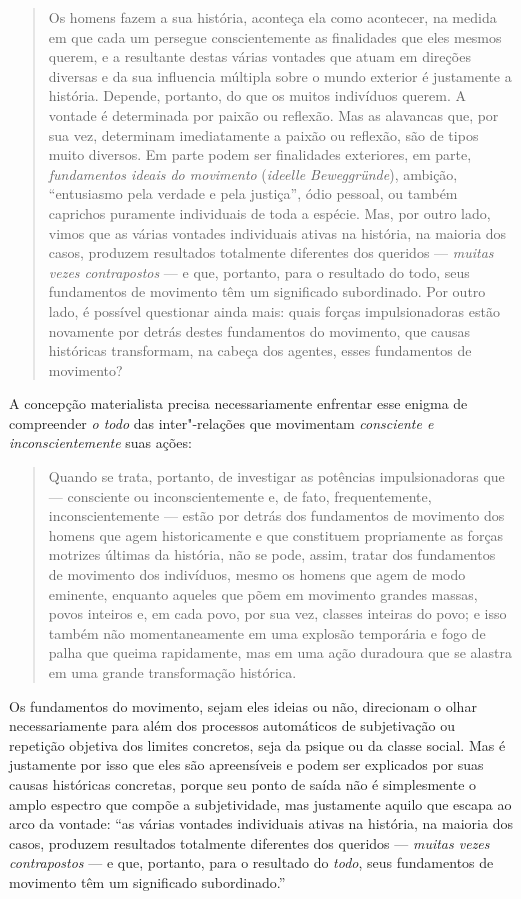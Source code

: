 \begin{quote}
Os homens fazem a sua história, aconteça ela como acontecer, na medida
em que cada um persegue conscientemente as finalidades que eles mesmos
querem, e a resultante destas várias vontades que atuam em direções
diversas e da sua influencia múltipla sobre o mundo exterior é
justamente a história. Depende, portanto, do que os muitos indivíduos
querem. A vontade é determinada por paixão ou reflexão. Mas as alavancas
que, por sua vez, determinam imediatamente a paixão ou reflexão, são de
tipos muito diversos. Em parte podem ser finalidades exteriores, em
parte, \emph{fundamentos ideais do movimento} (\emph{ideelle
Beweggründe}), ambição, ``entusiasmo pela verdade e pela justiça'', ódio
pessoal, ou também caprichos puramente individuais de toda a espécie.
Mas, por outro lado, vimos que as várias vontades individuais ativas na
história, na maioria dos casos, produzem resultados totalmente
diferentes dos queridos --- \emph{muitas vezes contrapostos} --- e que,
portanto, para o resultado do todo, seus fundamentos de movimento têm um
significado subordinado. Por outro lado, é possível questionar ainda
mais: quais forças impulsionadoras estão novamente por detrás destes
fundamentos do movimento, que causas históricas transformam, na cabeça
dos agentes, esses fundamentos de movimento?
\end{quote}

A concepção materialista precisa necessariamente enfrentar esse enigma
de compreender \emph{o todo} das inter"-relações que movimentam
\emph{consciente e inconscientemente} suas ações:

\begin{quote}
Quando se trata, portanto, de investigar as potências impulsionadoras
que --- consciente ou inconscientemente e, de fato, frequentemente,
inconscientemente --- estão por detrás dos fundamentos de movimento dos
homens que agem historicamente e que constituem propriamente as forças
motrizes últimas da história, não se pode, assim, tratar dos fundamentos
de movimento dos indivíduos, mesmo os homens que agem de modo eminente,
enquanto aqueles que põem em movimento grandes massas, povos inteiros e,
em cada povo, por sua vez, classes inteiras do povo; e isso também não
momentaneamente em uma explosão temporária e fogo de palha que queima
rapidamente, mas em uma ação duradoura que se alastra em uma grande
transformação histórica.
\end{quote}

Os fundamentos do movimento, sejam eles ideias ou não, direcionam o
olhar necessariamente para além dos processos automáticos de
subjetivação ou repetição objetiva dos limites concretos, seja da psique
ou da classe social. Mas é justamente por isso que eles são apreensíveis
e podem ser explicados por suas causas históricas concretas, porque seu
ponto de saída não é simplesmente o amplo espectro que compõe a
subjetividade, mas justamente aquilo que escapa ao arco da vontade: ``as
várias vontades individuais ativas na história, na maioria dos casos,
produzem resultados totalmente diferentes dos queridos --- \emph{muitas
vezes contrapostos} --- e que, portanto, para o resultado do
\emph{todo}, seus fundamentos de movimento têm um significado
subordinado.''

